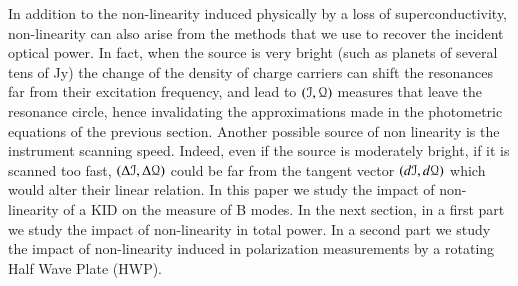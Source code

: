 In addition to the non-linearity induced physically by a loss of superconductivity, non-linearity can also arise from the methods that we use to recover the incident optical power. In fact, when the source is very bright (such as planets of several tens of Jy) the change of the density of charge carriers can shift the resonances far from their excitation frequency, and lead to $(\mathcal{I},\mathcal{Q})$ measures that leave the resonance circle, hence invalidating the approximations made in the photometric equations of the previous section. Another possible source of non linearity is the instrument scanning speed. Indeed, even if the source is moderately bright, if it is scanned too fast, $(\Delta\mathcal{I},\Delta\mathcal{Q})$ could be far from the tangent vector $(d\mathcal{I},d\mathcal{Q})$ which would alter their linear relation.
In this paper we study the impact of non-linearity of a KID on the measure of B modes. In the next section, in a first part we study the impact of non-linearity in total power. In a second part we study the impact of non-linearity induced in polarization measurements by a rotating Half Wave Plate (HWP).

